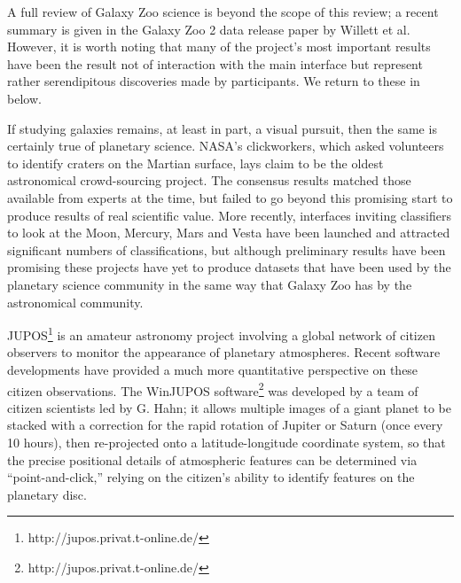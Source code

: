 \documentclass{ar2e}
\begin{document}


A full review of Galaxy Zoo science is beyond the scope of this review; a
recent summary is given in the Galaxy Zoo 2 data release paper by Willett et
al. However, it is worth noting that many of the project's most important
results have been the result not of interaction with the main interface but
represent rather serendipitous discoveries made by participants. We return to
these in  below.


If studying galaxies remains, at least in part, a visual pursuit, then the
same is certainly true of planetary science. NASA's clickworkers, which asked
volunteers to identify craters on the Martian surface, lays claim to be the
oldest astronomical crowd-sourcing project. The consensus results matched
those available from experts at the time, but failed to go beyond this
promising start to produce results of real scientific value. More recently,
interfaces inviting classifiers to look at the Moon, Mercury, Mars and Vesta
have been launched and attracted significant numbers of classifications, but
although preliminary results have been promising these projects have yet to
produce datasets that have been used by the planetary science community in the
same way that Galaxy Zoo has by the astronomical community. 




JUPOS\footnote{http://jupos.privat.t-online.de/} is an amateur astronomy
project involving a global network of citizen observers to monitor the
appearance of planetary atmospheres.  Recent software developments have
provided a much more quantitative perspective on these citizen observations.
The WinJUPOS software\footnote{http://jupos.privat.t-online.de/} was developed
by a team of citizen scientists led by G. Hahn; it allows multiple images of a
giant planet to be stacked with a correction for the rapid rotation of Jupiter
or Saturn  (once every 10 hours), then re-projected onto a latitude-longitude
coordinate system, so that the precise positional details of atmospheric
features can be determined via ``point-and-click,'' relying on the citizen's
ability to identify features on the planetary disc.  
\end{document}
